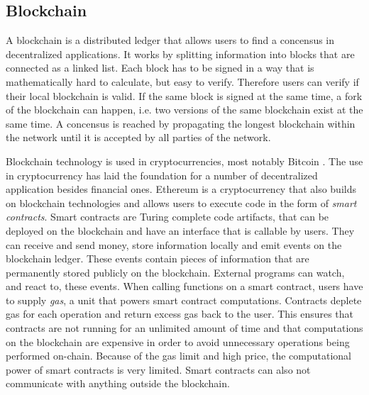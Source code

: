 \documentclass[runningheads]{llncs}
\begin{document}

\subsection{Blockchain}
A blockchain is a distributed ledger that allows users to find a concensus in decentralized applications.
It works by splitting information into blocks that are connected as a linked list.
Each block has to be signed in a way that is mathematically hard to calculate, but easy to verify.
Therefore users can verify if their local blockchain is valid.
If the same block is signed at the same time, a fork of the blockchain can happen, i.e. two versions of the same blockchain exist at the same time.
A concensus is reached by propagating the longest blockchain within the network until it is accepted by all parties of the network.

Blockchain technology is used in cryptocurrencies, most notably Bitcoin \cite{nakamoto2008bitcoin}.
The use in cryptocurrency has laid the foundation for a number of decentralized application besides financial ones.
Ethereum \cite{wood2014ethereum} is a cryptocurrency that also builds on blockchain technologies and allows users to execute code in the form of \emph{smart contracts}.
Smart contracts are Turing complete code artifacts, that can be deployed on the blockchain and have an interface that is callable by users.
They can receive and send money, store information locally and emit events on the blockchain ledger.
These events contain pieces of information that are permanently stored publicly on the blockchain.
External programs can watch, and react to, these events.
When calling functions on a smart contract, users have to supply \emph{gas}, a unit that powers smart contract computations.
Contracts deplete gas for each operation and return excess gas back to the user.
This ensures that contracts are not running for an unlimited amount of time and that computations on the blockchain are expensive in order to avoid unnecessary operations being performed on-chain.
Because of the gas limit and high price, the computational power of smart contracts is very limited.
Smart contracts can also not communicate with anything outside the blockchain.

\end{document}
